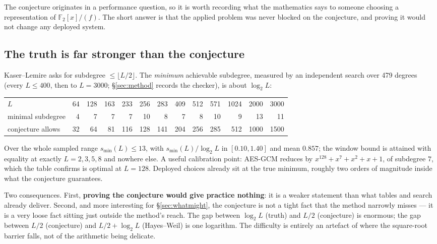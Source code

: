 \documentclass[10pt]{article}
\theoremstyle{plain}
\theoremstyle{definition}
\newcommand{\F}{\mathbb F}
\begin{document}
The conjecture originates in a performance question, so it is worth recording
what the mathematics says to someone choosing a representation of
$\F_2[x]/(f)$. The short answer is that the applied problem was never blocked
on the conjecture, and proving it would not change any deployed system.

\subsection{The truth is far stronger than the conjecture}

Kaser--Lemire asks for subdegree $\le\lfloor L/2\rfloor$. The \emph{minimum}
achievable subdegree, measured by an independent search over 479 degrees
(every $L\le400$, then to $L=3000$; \S\ref{sec:method} records the checker),
is about $\log_2 L$:

\begin{center}\small
\begin{tabular}{lrrrrrrrrrrrr}
\hline
$L$ & 64 & 128 & 163 & 233 & 256 & 283 & 409 & 512 & 571 & 1024 & 2000 & 3000\\
minimal subdegree & 4 & 7 & 7 & 7 & 10 & 8 & 7 & 8 & 10 & 9 & 13 & 11\\
conjecture allows & 32 & 64 & 81 & 116 & 128 & 141 & 204 & 256 & 285 & 512 & 1000 & 1500\\
\hline
\end{tabular}
\end{center}

Over the whole sampled range $s_{\min}(L)\le13$, with
$s_{\min}(L)/\log_2 L$ in $[0.10,1.40]$ and mean $0.857$; the window bound is
attained with equality at exactly $L=2,3,5,8$ and nowhere else. A useful
calibration point: AES-GCM reduces by $x^{128}+x^7+x^2+x+1$, of subdegree $7$,
which the table confirms is optimal at $L=128$. Deployed choices already sit
at the true minimum, roughly two orders of magnitude inside what the
conjecture guarantees.

Two consequences. First, \textbf{proving the conjecture would give practice
nothing}: it is a weaker statement than what tables and search already
deliver. Second, and more interesting for \S\ref{sec:whatmight}, the
conjecture is not a tight fact that the method narrowly misses --- it is a
very loose fact sitting just outside the method's reach. The gap between
$\log_2 L$ (truth) and $L/2$ (conjecture) is enormous; the gap between $L/2$
(conjecture) and $L/2+\log_2 L$ (Hayes--Weil) is one logarithm. The difficulty
is entirely an artefact of where the square-root barrier falls, not of the
arithmetic being delicate.
\end{document}
